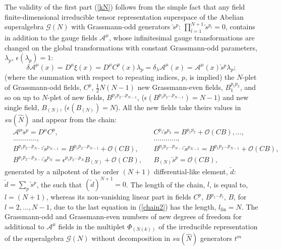 \documentclass[10pt]{article}
\begin{document}
The  validity of  the first part (\ref{kN}) follows from the simple fact that any field finite-dimensional irreducible tensor representation superspace  of the Abelian superalgebra
$\mathcal{G}(N)$ with Grassmann-odd generators $\overleftarrow{s}{}^p$: $\prod_{l=1}^{N+1}\overleftarrow{s}{}^{p_l}=0$,  contains in addition to the gauge fields $\mathcal{A}^\mu$, whose infinitesimal gauge transformations are changed on the global transformations with constant Grassmann-odd parameters, $\lambda_p$, $\epsilon(\lambda_p)=1$:
\begin{equation}\label{gtbt}
  \delta \mathcal{A}^\mu(x) = D^\mu \xi (x) =  D^\mu C^p(x)\lambda_p = \delta_\lambda  \mathcal{A}^\mu(x) = \mathcal{A}^\mu(x) \overleftarrow{s}{}^p\lambda_p  ;
\end{equation}
(where the summation with respect to repeating indices, $p$, is implied)
the $N$-plet of Grassmann-odd fields,
$C^p$, $\frac{1}{2}N(N-1)$ new Grassmann-even fields, $B_1^{p_1p_2}$, and so on up to $N$-plet of new  fields, $B^{p_1p_2...p_{N-1}}$, ($\epsilon(B^{p_1p_2...p_{N-1}})=N-1$) and new single field, $B_{(N)}$, ($\epsilon(B_{(N)}) = N$). All the new fields take theirs values in  $su(\hat{N})$ and appear from the  chain:
\begin{align}
  & \mathcal{A}^\mu \overleftarrow{s}{}^p= D^\mu C^p, &&  C^{p_1}\overleftarrow{s}{}^{p_2}=  B^{p_1p_2}+\mathcal{O}(CB), \ldots,  \label{chain1} \\
  & \ldots\ldots\ldots\ldots, && \ldots\ldots\ldots\ldots, \nonumber\\
  & B^{p_1p_2...p_{N-2}}\overleftarrow{s}{}^{p_{N-1}} =B^{p_1p_2...p_{N-1}}+\mathcal{O}(CB),
 & & B^{p_1p_2...p_{N-1}}\overleftarrow{s}{}^{p_{N-1}} =B^{p_1p_2...p_{N-1}}+\mathcal{O}(CB), \\
  &  B^{p_1p_2...p_{N-1}}\overleftarrow{s}{}^{p_{N}} =\epsilon^{p_1p_2...p_{N}}B_{(N)}+\mathcal{O}(CB), &&  B_{(N)}\overleftarrow{s}{}^p=\mathcal{O}(CB), \label{chain2}
\end{align}
generated by a nilpotent of the order $(N+1)$ differential-like element, $\overleftarrow{d}:$ $\overleftarrow{d} = \sum_p \overleftarrow{s}{}^p$, the such that  $(\overleftarrow{d})^{N+1}=0$.
The length of the chain, $l$, is equal to, $l=(N+1)$, whereas its non-vanishing linear part  in fields $C^p$, $B^{p_1...p_l}$, $B$, for $l=2,...,N-1$,  due to the last equation in (\ref{chain2}) has the length, $l_{\mathrm{lin}} = N$.
The Grassmann-odd and Grassmann-even numbers of new degrees of freedom  for additional to $ \mathcal{A}^\mu$ fields in the   multiplet $\Phi_{(N(k))}$ of the irreducible representation of the superalgebra $\mathcal{G}(N)$ without decomposition in $su(\hat{N})$ generators $t^m$
\end{document}

